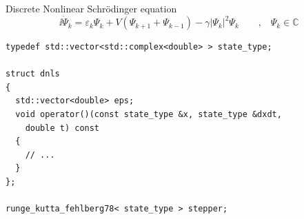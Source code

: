 \begin{frame}[fragile]

 \vspace{2ex}

 Discrete Nonlinear Schr\"odinger equation
$$
  \ii \dot{\Psi}_k = \varepsilon_k \Psi_k + V( \Psi_{k+1}+\Psi_{k-1}) - \gamma |\Psi_k|^2 \Psi_k
  \quad \quad \text{,} \quad \Psi_k \in \mathbb{C}
$$
 

 \begin{lstlisting}[basicstyle=\scriptsize\ttfamily]
typedef std::vector<std::complex<double> > state_type;

struct dnls
{
  std::vector<double> eps;
  void operator()(const state_type &x, state_type &dxdt,
    double t) const
  {
    // ...
  }
};

runge_kutta_fehlberg78< state_type > stepper;
 \end{lstlisting}

\end{frame}

